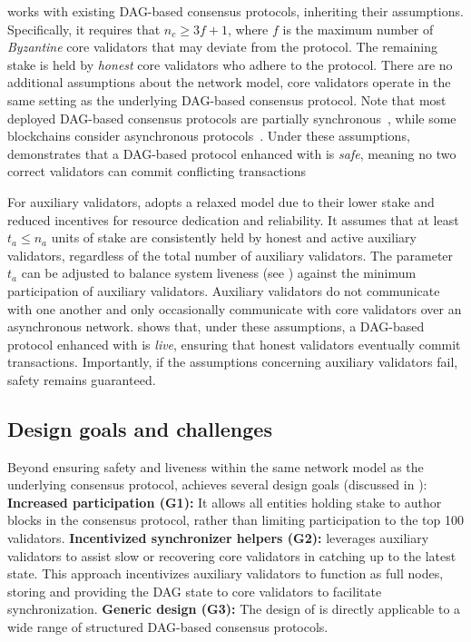 \sysname works with existing DAG-based consensus protocols, inheriting their assumptions. Specifically, it requires that $n_c \geq 3f + 1$, where $f$ is the maximum number of \emph{Byzantine} core validators that may deviate from the protocol. The remaining stake is held by \emph{honest} core validators who adhere to the protocol. There are no additional assumptions about the network model, core validators operate in the same setting as the underlying DAG-based consensus protocol. Note that most deployed DAG-based consensus protocols are partially synchronous~\cite{dwork1988consensus}, while some blockchains consider asynchronous protocols~\cite{sui-code}. Under these assumptions,  demonstrates that a DAG-based protocol enhanced with \sysname is \emph{safe}, meaning no two correct validators can commit conflicting transactions

For auxiliary validators, \sysname adopts a relaxed model due to their lower stake and reduced incentives for resource dedication and reliability. It assumes that at least $t_a \leq n_a$ units of stake are consistently held by honest and active auxiliary validators, regardless of the total number of auxiliary validators. The parameter $t_a$ can be adjusted to balance system liveness (see ) against the minimum participation of auxiliary validators. Auxiliary validators do not communicate with one another and only occasionally communicate with core validators over an asynchronous network.  shows that, under these assumptions, a DAG-based protocol enhanced with \sysname is \emph{live}, ensuring that honest validators eventually commit transactions. Importantly, if the assumptions concerning auxiliary validators fail, safety remains guaranteed.

\subsection{Design goals and challenges} \label{sec:goals}

Beyond ensuring safety and liveness within the same network model as the underlying consensus protocol, \sysname achieves several design goals (discussed in ):
\textbf{Increased participation (G1):} It allows all entities holding stake to author blocks in the consensus protocol, rather than limiting participation to the top 100 validators.
\textbf{Incentivized synchronizer helpers (G2):} \sysname leverages auxiliary validators to assist slow or recovering core validators in catching up to the latest state. This approach incentivizes auxiliary validators to function as full nodes, storing and providing the DAG state to core validators to facilitate synchronization.
\textbf{Generic design (G3):} The design of \sysname is directly applicable to a wide range of structured DAG-based consensus protocols.

